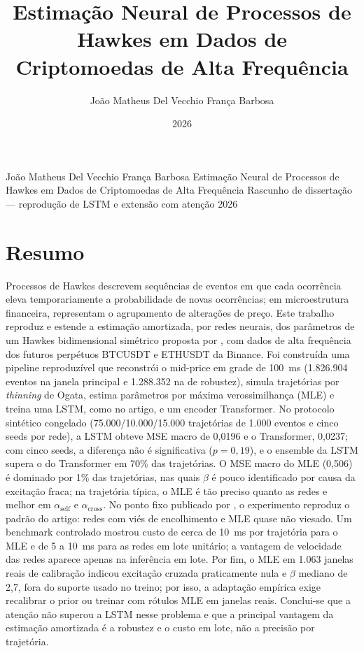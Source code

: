 \documentclass[12pt,a4paper,openany]{report}
\title{Estimação Neural de Processos de Hawkes em Dados de Criptomoedas de Alta Frequência}
\author{João Matheus Del Vecchio França Barbosa}
\date{2026}
\begin{document}
\tgtitlepage
  {João Matheus Del Vecchio França Barbosa}
  {Estimação Neural de Processos de Hawkes em Dados de Criptomoedas de Alta Frequência}
  {Rascunho de dissertação --- reprodução de LSTM e extensão com atenção}
  {2026}

\chapter*{Resumo}

Processos de Hawkes descrevem sequências de eventos em que cada ocorrência eleva
temporariamente a probabilidade de novas ocorrências; em microestrutura financeira,
representam o agrupamento de alterações de preço. Este trabalho reproduz e estende a
estimação amortizada, por redes neurais, dos parâmetros de um Hawkes bidimensional
simétrico proposta por \citet{lee2023}, com dados de alta frequência dos futuros
perpétuos BTCUSDT e ETHUSDT da Binance. Foi construída uma pipeline reproduzível que
reconstrói o mid-price em grade de 100~ms (1.826.904 eventos na janela principal e
1.288.352 na de robustez), simula trajetórias por \emph{thinning} de Ogata, estima
parâmetros por máxima verossimilhança (MLE) e treina uma LSTM, como no artigo, e um
encoder Transformer. No protocolo sintético congelado (75.000/10.000/15.000
trajetórias de 1.000 eventos e cinco seeds por rede), a LSTM obteve MSE macro de
0,0196 e o Transformer, 0,0237; com cinco seeds, a diferença não é significativa
($p=0{,}19$), e o ensemble da LSTM supera o do Transformer em 70\% das trajetórias.
O MSE macro do MLE (0,506) é dominado por 1\% das trajetórias, nas quais $\beta$ é
pouco identificado por causa da excitação fraca; na trajetória típica, o MLE é tão
preciso quanto as redes e melhor em $\alpha_{\mathrm{self}}$ e
$\alpha_{\mathrm{cross}}$. No ponto fixo publicado por \citet{lee2023}, o
experimento reproduz o padrão do artigo: redes com viés de encolhimento e MLE quase
não viesado. Um benchmark controlado mostrou custo de cerca de 10~ms por trajetória
para o MLE e de 5 a 10~ms para as redes em lote unitário; a vantagem de velocidade
das redes aparece apenas na inferência em lote. Por fim, o MLE em 1.063 janelas reais
de calibração indicou excitação cruzada praticamente nula e $\beta$ mediano de 2,7,
fora do suporte usado no treino; por isso, a adaptação empírica exige recalibrar o
prior ou treinar com rótulos MLE em janelas reais. Conclui-se que a atenção não
superou a LSTM nesse problema e que a principal vantagem da estimação amortizada é a
robustez e o custo em lote, não a precisão por trajetória.
\end{document}
